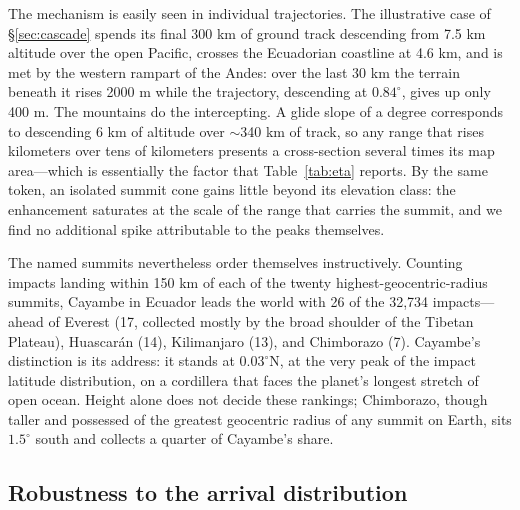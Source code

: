 \documentclass[twocolumn]{aastex701}
\begin{document}
The mechanism is easily seen in individual trajectories. The illustrative
case of \S\ref{sec:cascade} spends its final 300 km of ground track
descending from 7.5 km altitude over the open Pacific, crosses the
Ecuadorian coastline at 4.6 km, and is met by the western rampart of the
Andes: over the last 30 km the terrain beneath it rises 2000 m while the
trajectory, descending at $0.84^{\circ}$, gives up only 400 m. The
mountains do the intercepting. A glide slope of a degree corresponds to
descending 6 km of altitude over $\sim$340 km of track, so any range that
rises kilometers over tens of kilometers presents a cross-section several
times its map area---which is essentially the factor that
Table~\ref{tab:eta} reports. By the same token, an isolated summit cone
gains little beyond its elevation class: the enhancement saturates at the
scale of the range that carries the summit, and we find no additional
spike attributable to the peaks themselves.

The named summits nevertheless order themselves instructively. Counting
impacts landing within 150 km of each of the twenty highest-geocentric-radius
summits, Cayambe in Ecuador leads the world with 26 of the 32,734
impacts---ahead of Everest (17, collected mostly by the broad shoulder of
the Tibetan Plateau), Huascar\'an (14), Kilimanjaro (13), and Chimborazo
(7). Cayambe's distinction is its address: it stands at $0.03^{\circ}$N,
at the very peak of the impact latitude distribution, on a cordillera
that faces the planet's longest stretch of open ocean. Height alone does
not decide these rankings; Chimborazo, though taller and possessed of the
greatest geocentric radius of any summit on Earth, sits $1.5^{\circ}$
south and collects a quarter of Cayambe's share.

\subsection{Robustness to the arrival distribution} \label{sec:prior}
\end{document}
